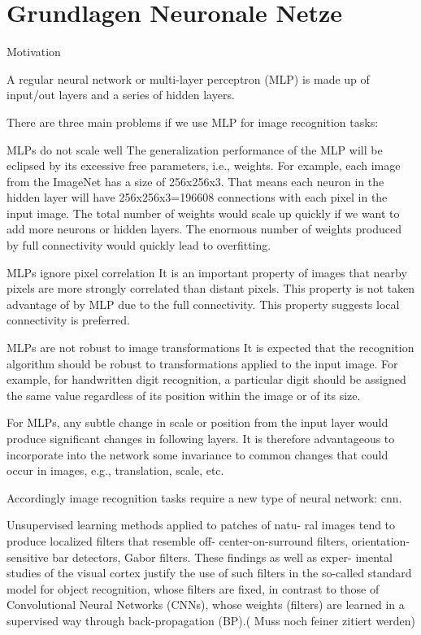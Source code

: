 \documentclass{sig-alternate-05-2015}
\begin{document}
\section{Grundlagen Neuronale Netze}
Motivation

A regular neural network or multi-layer perceptron (MLP) is made up of input/out layers and a series of hidden layers. 

There are three main problems if we use MLP for image recognition tasks:


MLPs do not scale well
The generalization performance of the MLP will be eclipsed by its excessive free parameters, i.e., weights. For example, each image from the ImageNet  has a size of 256x256x3. That means each neuron in the hidden layer will have 256x256x3=196608 connections with each pixel in the input image. The total number of weights would scale up quickly if we want to add more neurons or hidden layers. The enormous number of weights produced by full connectivity would quickly lead to overfitting.


MLPs ignore pixel correlation
It is an important property of images that nearby pixels are more strongly correlated than distant pixels. This property is not taken advantage of by MLP due to the full connectivity. This property suggests local connectivity is preferred.

MLPs are not robust to image transformations
It is expected that the recognition algorithm should be robust to transformations applied to the input image. For example, for handwritten digit recognition, a particular digit should be assigned the same value regardless of its position within the image or of its size.

For MLPs, any subtle change in scale or position from the input layer would produce significant changes in following layers. It is therefore advantageous to incorporate into the network some invariance to common changes that could occur in images, e.g., translation, scale, etc.

Accordingly image recognition tasks require a new type of neural network: cnn.

Unsupervised learning methods applied to patches of natu- ral images tend to produce localized filters that resemble off- center-on-surround filters, orientation-sensitive bar detectors, Gabor filters. These findings as well as exper- imental studies of the visual cortex justify the use of such filters in the so-called standard model for object recognition, whose filters are fixed, in contrast to those of Convolutional Neural Networks (CNNs), whose weights (filters) are learned in a supervised way through back-propagation (BP).(\cite{6033458} Muss noch feiner zitiert werden)
\end{document}
